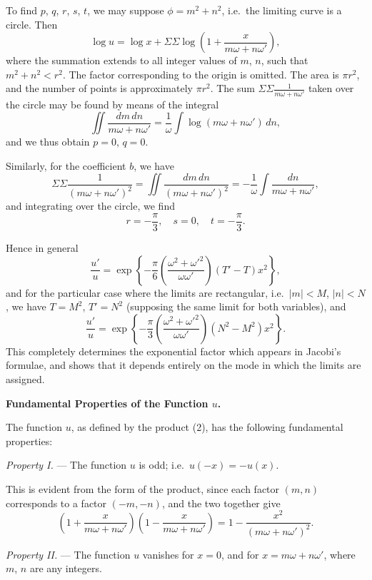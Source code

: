 \documentclass[12pt,a4paper]{article}
\begin{document}
\newpage
\setcounter{page}{140}

To find $p$, $q$, $r$, $s$, $t$, we may suppose $\phi = m^2 + n^2$, i.e.\ the limiting curve is a circle.
Then
\[
\log u = \log x + \Sigma \Sigma \log\left(1 + \frac{x}{m\omega + n\omega'}\right),
\]
where the summation extends to all integer values of $m$, $n$, such that $m^2 + n^2 < r^2$.
The factor corresponding to the origin is omitted. The area is $\pi r^2$, and the number
of points is approximately $\pi r^2$. The sum $\Sigma \Sigma \frac{1}{m\omega + n\omega'}$ taken over the circle may
be found by means of the integral
\[
\iint \frac{dm\,dn}{m\omega + n\omega'} = \frac{1}{\omega} \int \log(m\omega + n\omega')\,dn,
\]
and we thus obtain $p = 0$, $q = 0$.

Similarly, for the coefficient $b$, we have
\[
\Sigma \Sigma \frac{1}{(m\omega + n\omega')^2} = \iint \frac{dm\,dn}{(m\omega + n\omega')^2} = -\frac{1}{\omega} \int \frac{dn}{m\omega + n\omega'},
\]
and integrating over the circle, we find
\[
r = -\frac{\pi}{3},\quad s = 0,\quad t = -\frac{\pi}{3}.
\]

\newpage
\setcounter{page}{141}

Hence in general
\[
\frac{u'}{u} = \exp\left\{-\frac{\pi}{6}\left(\frac{\omega^2 + \omega'^2}{\omega\omega'}\right)(T' - T)x^2\right\},
\]
and for the particular case where the limits are rectangular, i.e.\ $|m| < M$, $|n| < N$,
we have $T = M^2$, $T' = N^2$ (supposing the same limit for both variables), and
\[
\frac{u'}{u} = \exp\left\{-\frac{\pi}{3}\left(\frac{\omega^2 + \omega'^2}{\omega\omega'}\right)(N^2 - M^2)x^2\right\}.
\]
This completely determines the exponential factor which appears in Jacobi's formulae,
and shows that it depends entirely on the mode in which the limits are assigned.

\medskip

\textbf{Fundamental Properties of the Function $u$.}

The function $u$, as defined by the product (2), has the following fundamental
properties:

\medskip
\textit{Property I.} --- The function $u$ is odd; i.e.\ $u(-x) = -u(x)$.

This is evident from the form of the product, since each factor $(m, n)$ corresponds
to a factor $(-m, -n)$, and the two together give
\[
\left(1 + \frac{x}{m\omega + n\omega'}\right)\left(1 - \frac{x}{m\omega + n\omega'}\right) = 1 - \frac{x^2}{(m\omega + n\omega')^2}.
\]

\medskip
\textit{Property II.} --- The function $u$ vanishes for $x = 0$, and for $x = m\omega + n\omega'$,
where $m$, $n$ are any integers.
\end{document}
